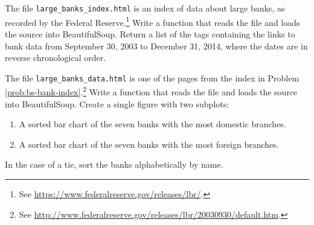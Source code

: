 \begin{problem} %
The file \texttt{large\_banks\_index.html} is an index of data about large banks, as recorded by the Federal Reserve.\footnote{See \url{https://www.federalreserve.gov/releases/lbr/}.}
Write a function that reads the file and loads the source into BeautifulSoup.
Return a list of the tags containing the links to bank data from September 30, 2003 to December 31, 2014, where the dates are in reverse chronological order.
\label{prob:bs-bank-index}
\end{problem}

\begin{problem} %
The file \texttt{large\_banks\_data.html} is one of the pages from the index in Problem \ref{prob:bs-bank-index}.\footnote{See \url{http://www.federalreserve.gov/releases/lbr/20030930/default.htm}.}
Write a function that reads the file and loads the source into BeautifulSoup.
Create a single figure with two subplots:
\begin{enumerate}
    \item A sorted bar chart of the seven banks with the most domestic branches.
    \item A sorted bar chart of the seven banks with the most foreign branches.
\end{enumerate}
In the case of a tie, sort the banks alphabetically by name.
\end{problem}
